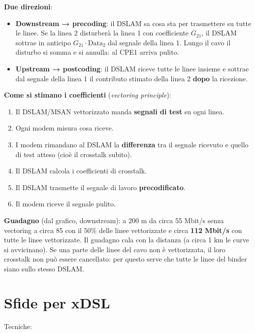\textbf{Due direzioni}:

\begin{itemize}
\tightlist
\item
  \textbf{Downstream → precoding}: il DSLAM sa cosa sta per trasmettere su tutte le linee. Se la linea 2 disturberà la linea 1 con coefficiente \(G_{21}\), il DSLAM sottrae in anticipo \(G_{21} \cdot \text{Data}_2\) dal segnale della linea 1. Lungo il cavo il disturbo si somma e si annulla: al CPE1 arriva pulito.
\item
  \textbf{Upstream → postcoding}: il DSLAM riceve tutte le linee insieme e sottrae dal segnale della linea 1 il contributo stimato della linea 2 \textbf{dopo} la ricezione.
\end{itemize}

\textbf{Come si stimano i coefficienti} (\emph{vectoring principle}):

\begin{enumerate}
\def\labelenumi{\arabic{enumi}.}
\tightlist
\item
  Il DSLAM/MSAN vettorizzato manda \textbf{segnali di test} su ogni linea.
\item
  Ogni modem misura cosa riceve.
\item
  I modem rimandano al DSLAM la \textbf{differenza} tra il segnale ricevuto e quello di test atteso (cioè il crosstalk subito).
\item
  Il DSLAM calcola i coefficienti di crosstalk.
\item
  Il DSLAM trasmette il segnale di lavoro \textbf{precodificato}.
\item
  Il modem riceve il segnale pulito.
\end{enumerate}

\textbf{Guadagno} (dal grafico, downstream): a 200 m da circa 55 Mbit/s senza vectoring a circa 85 con il 50\% delle linee vettorizzate e circa \textbf{112 Mbit/s} con tutte le linee vettorizzate. Il guadagno cala con la distanza (a circa 1 km le curve si avvicinano). Se una parte delle linee del cavo non è vettorizzata, il loro crosstalk non può essere cancellato: per questo serve che tutte le linee del binder siano sullo stesso DSLAM.

\section{Sfide per xDSL}

Tecniche:

